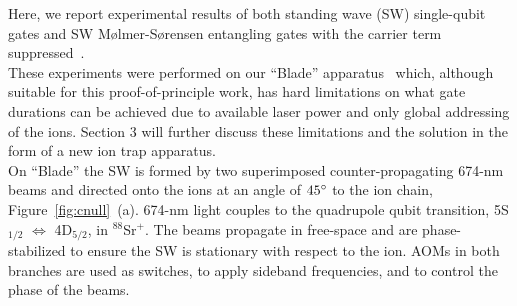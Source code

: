 \documentclass[12pt]{iopart}
\begin{document}
    Here, we report experimental results of both standing wave (SW)
    single-qubit gates and SW M\o lmer-S\o rensen
    entangling gates with the carrier term suppressed~\cite{saner_breaking_2023}.\\
    These experiments were performed on our ``Blade'' apparatus~\cite{schafer_fast_2020, thirumalai_high-fidelity_2019} which,
    although suitable for this proof-of-principle work, has hard
    limitations on what gate durations can be achieved due to
    available laser power and only global addressing of the ions.
    Section 3 will further discuss these limitations and the solution
    in the form of a new ion trap apparatus.\\

    On ``Blade'' the SW is formed by two superimposed
    counter-propagating 674-nm beams and directed onto the ions at an
    angle of $45\degree$ to the ion chain,
    Figure~\ref{fig:cnull}~(a). 674-nm light couples to the quadrupole
    qubit transition, 5S$_{1/2}$ $\Leftrightarrow$ 4D$_{5/2}$, in
    $^{88}$Sr$^+$.  The beams propagate in free-space and are
    phase-stabilized to ensure the SW is stationary with respect to
    the ion. AOMs in both branches are used as switches, to apply
    sideband frequencies, and to control the phase of the beams.\\



\end{document}

